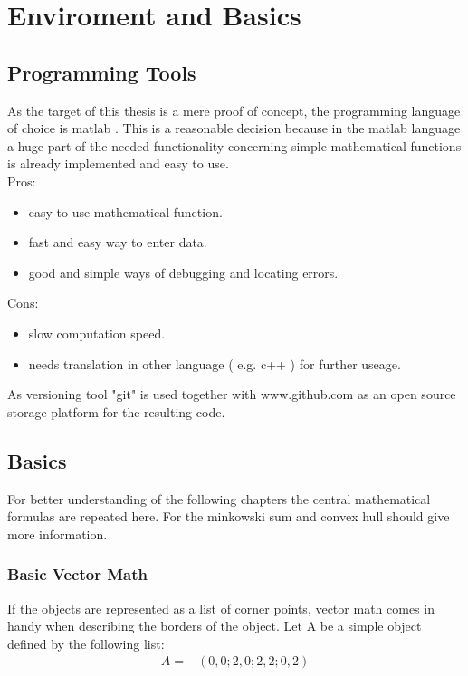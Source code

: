 \chapter{Enviroment and Basics}
\label{cha:enviromentandbasics}

\section{Programming Tools}
As the target of this thesis is a mere proof of concept, the programming language of choice is matlab \cite{tool:matlab}. This is a reasonable decision because in the matlab language a huge part of the needed functionality concerning simple mathematical functions is already implemented and easy to use. \\
Pros:
\begin{itemize}
\item easy to use mathematical function.
\item fast and easy way to enter data.
\item good and simple ways of debugging and locating errors.
\end{itemize}
Cons:
\begin{itemize}
\item slow computation speed.
\item needs translation in other language ( e.g. c++ ) for further useage.
\end{itemize}

As versioning tool "git" \cite{tool:git} is used together with www.github.com as an open source storage platform for the resulting code.

\section{Basics}
For better understanding of the following chapters the central mathematical formulas are repeated here.
For the minkowski sum and convex hull \cite{minkowski} should give more information.
\subsection{Basic Vector Math} %
If the objects are represented as a list of corner points, vector math comes in handy when describing the borders of the object.
Let A be a simple object defined by the following list:
\begin{align*}
A = 	&( 0 , 0 ;2 , 0 ;2, 2; 0, 2)	
\end{align*}

